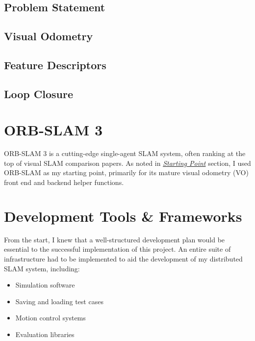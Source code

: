 \subsection{Problem Statement}
\label{sec:visual-slam-problem-statement}


\subsection{Visual Odometry}
\label{sec:visual-slam-visual-odometry}


\subsection{Feature Descriptors}
\label{sec:visual-slam-feature-descriptors}


\subsection{Loop Closure}
\label{sec:visual-slam-loop-closure}


\section{ORB-SLAM 3}
\label{sec:orb-slam-3}
ORB-SLAM 3 is a cutting-edge single-agent SLAM system, often ranking at the top of visual SLAM comparison papers. As noted in \hyperref[sec:starting-point]{\textit{Starting Point}} section, I used ORB-SLAM as my starting point, primarily for its mature visual odometry (VO) front end and backend helper functions.

\section{Development Tools \& Frameworks}
\label{sec:development-tools-and-frameworks}
From the start, I knew that a well-structured development plan would be essential to the successful implementation of this project. An entire suite of infrastructure had to be implemented to aid the development of my distributed SLAM system, including: \noparskip
{
    \begin{itemize}[nosep]
        \item Simulation software
        \item Saving and loading test cases
        \item Motion control systems
        \item Evaluation libraries
    \end{itemize}
}

